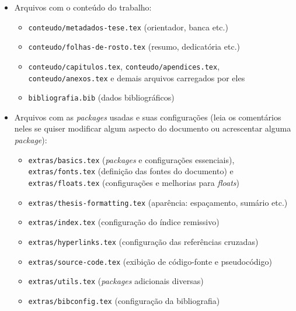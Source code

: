 \begin{itemize}
  \item Arquivos com o conteúdo do trabalho:
  \begin{itemize}
    \item \texttt{conteudo/metadados-tese.tex} (orientador, banca etc.)
    \item \texttt{conteudo/folhas-de-rosto.tex} (resumo, dedicatória etc.)
    \item \texttt{conteudo/capitulos.tex}, \texttt{conteudo/apendices.tex},
          \texttt{conteudo/anexos.tex} e demais arquivos carregados por eles
    \item \texttt{bibliografia.bib} (dados bibliográficos)
  \end{itemize}

  \item Arquivos com as \textit{packages} usadas e suas configurações (leia
        os comentários neles se quiser modificar algum aspecto do
        documento ou acrescentar alguma \textit{package}):
  \begin{itemize}
    \item \texttt{extras/basics.tex} (\textit{packages} e configurações essenciais),
          \texttt{extras/fonts.tex} (definição das fontes do documento) e
          \texttt{extras/floats.tex} (configurações e melhorias para \textit{floats})
    \item \texttt{extras/thesis-formatting.tex} (aparência: espaçamento, sumário etc.)
    \item \texttt{extras/index.tex} (configuração do índice remissivo)
    \item \texttt{extras/hyperlinks.tex} (configuração das referências cruzadas)
    \item \texttt{extras/source-code.tex} (exibição de código-fonte e pseudocódigo)
    \item \texttt{extras/utils.tex} (\textit{packages} adicionais diversas)
    \item \texttt{extras/bibconfig.tex} (configuração da bibliografia)
  \end{itemize}


\end{itemize}
